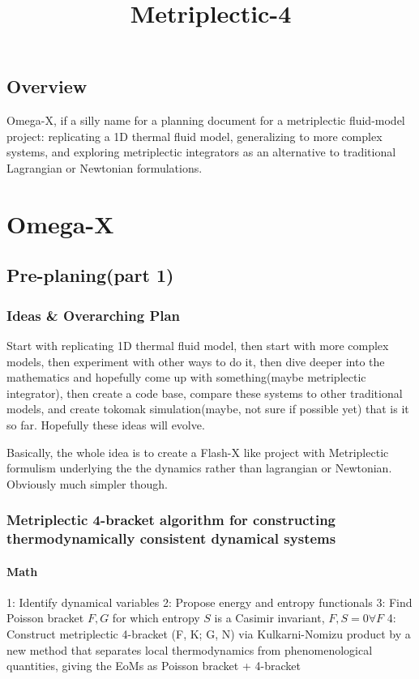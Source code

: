 \title{Metriplectic-4}

\section{Overview}
Omega-X, if a silly name for a planning document for a metriplectic fluid-model project: replicating a 1D thermal fluid model, generalizing to more complex systems, and exploring metriplectic integrators as an alternative to traditional Lagrangian or Newtonian formulations.


\chapter{Omega-X}
\section{Pre-planing(part 1)}
\subsection{Ideas \& Overarching Plan}
\par Start with replicating 1D thermal fluid model, then start with more complex models, then experiment with other ways to do it, then dive deeper into the mathematics and hopefully come up with something(maybe metriplectic integrator), then create a code base, compare these systems to other traditional models, and create tokomak simulation(maybe, not sure if possible yet) that is it so far. Hopefully these ideas will evolve. 

Basically, the whole idea is to create a Flash-X like project with Metriplectic formulism underlying the the dynamics rather than lagrangian or Newtonian. Obviously much simpler though.

\subsection{Metriplectic 4-bracket algorithm for constructing thermodynamically consistent
 dynamical systems}
\subsubsection{Math}
1: Identify dynamical variables
2: Propose energy and entropy functionals
3: Find Poisson bracket ${F, G}$ for which entropy $S$ is a Casimir invariant, ${F, S} = 0 \forall F$
4: Construct metriplectic 4-bracket (F, K; G, N) via Kulkarni-Nomizu product by a new method that separates local thermodynamics from phenomenological quantities, giving the EoMs as Poisson bracket + 4-bracket

